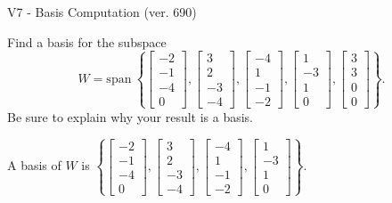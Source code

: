 \begin{exercise}
  \begin{exerciseTitle}V7 - Basis Computation (ver. 690)\end{exerciseTitle}
  \begin{exerciseStatement}
    Find a basis for the subspace 
\[W=\mathrm{span}\ \left\{\left[\begin{array}{r}
-2 \\
-1 \\
-4 \\
0
\end{array}\right] , \left[\begin{array}{r}
3 \\
2 \\
-3 \\
-4
\end{array}\right] , \left[\begin{array}{r}
-4 \\
1 \\
-1 \\
-2
\end{array}\right] , \left[\begin{array}{r}
1 \\
-3 \\
1 \\
0
\end{array}\right] , \left[\begin{array}{r}
3 \\
3 \\
0 \\
0
\end{array}\right]\right\}.\]
 Be sure to explain why your result is a basis.


  \end{exerciseStatement}
  \begin{exerciseAnswer}
   A basis of \(W\) is  \(\left\{\left[\begin{array}{r}
-2 \\
-1 \\
-4 \\
0
\end{array}\right] , \left[\begin{array}{r}
3 \\
2 \\
-3 \\
-4
\end{array}\right] , \left[\begin{array}{r}
-4 \\
1 \\
-1 \\
-2
\end{array}\right] , \left[\begin{array}{r}
1 \\
-3 \\
1 \\
0
\end{array}\right]\right\}\).
  


  \end{exerciseAnswer}
\end{exercise}